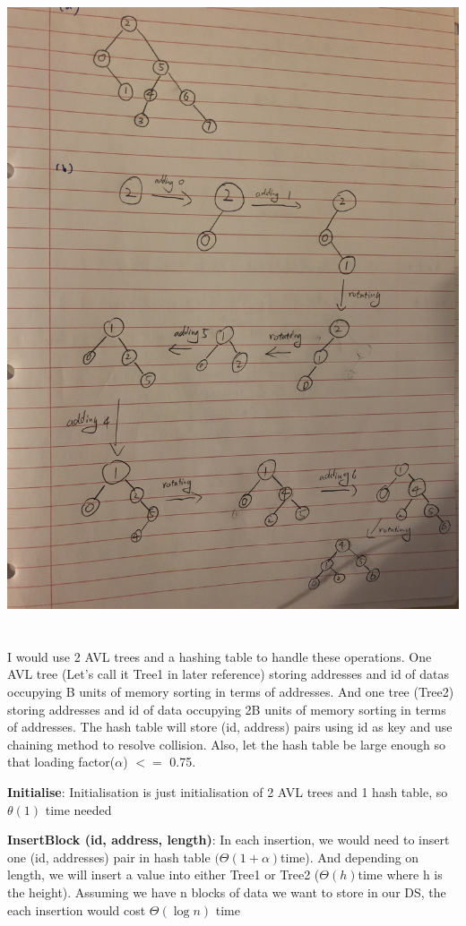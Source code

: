\documentclass[12pt]{article}
\begin{document}
\includegraphics[scale = 0.15, angle = 270]{3.jpg}


\pagebreak
\section{}
I would use 2 AVL trees and a hashing table to handle these operations. One AVL tree (Let's call it Tree1 in later reference) storing addresses and id of datas occupying B units of memory sorting in terms of addresses. And one tree (Tree2) storing addresses and id of data occupying 2B units of memory sorting in terms of addresses. The hash table will store (id, address) pairs using id as key and use chaining method to resolve collision. Also, let the hash table be large enough so that loading factor($\alpha$) $<=$ 0.75.

\textbf{Initialise}:  Initialisation is just initialisation of 2 AVL trees and 1 hash table, so $\theta(1)$ time needed

\textbf{InsertBlock (id, address, length)}: In each insertion, we would need to insert one (id, addresses) pair in hash table $(\Theta(1+\alpha) $time). And depending on length, we will insert a value into either Tree1 or Tree2 ($\Theta(h)$time where h is the height). Assuming we have n blocks of data we want to store in our DS, the each insertion would cost $\Theta(\log n)$ time
\end{document}
